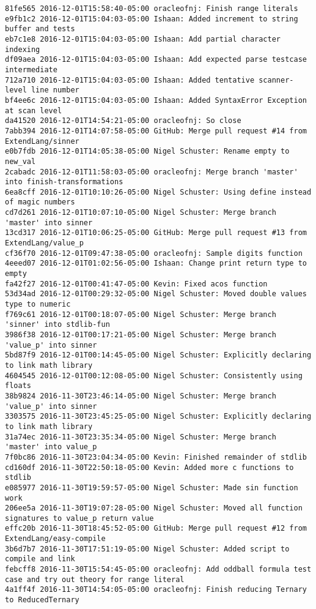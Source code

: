 \begin{lstlisting}
81fe565 2016-12-01T15:58:40-05:00 oracleofnj: Finish range literals
e9fb1c2 2016-12-01T15:04:03-05:00 Ishaan: Added increment to string buffer and tests
eb7c1e8 2016-12-01T15:04:03-05:00 Ishaan: Add partial character indexing
df09aea 2016-12-01T15:04:03-05:00 Ishaan: Add expected parse testcase intermediate
712a710 2016-12-01T15:04:03-05:00 Ishaan: Added tentative scanner-level line number
bf4ee6c 2016-12-01T15:04:03-05:00 Ishaan: Added SyntaxError Exception at scan level
da41520 2016-12-01T14:54:21-05:00 oracleofnj: So close
7abb394 2016-12-01T14:07:58-05:00 GitHub: Merge pull request #14 from ExtendLang/sinner
e0b7fdb 2016-12-01T14:05:38-05:00 Nigel Schuster: Rename empty to new_val
2cabadc 2016-12-01T11:58:03-05:00 oracleofnj: Merge branch 'master' into finish-transformations
6ea8cff 2016-12-01T10:10:26-05:00 Nigel Schuster: Using define instead of magic numbers
cd7d261 2016-12-01T10:07:10-05:00 Nigel Schuster: Merge branch 'master' into sinner
13cd317 2016-12-01T10:06:25-05:00 GitHub: Merge pull request #13 from ExtendLang/value_p
cf36f70 2016-12-01T09:47:38-05:00 oracleofnj: Sample digits function
4eeed07 2016-12-01T01:02:56-05:00 Ishaan: Change print return type to empty
fa42f27 2016-12-01T00:41:47-05:00 Kevin: Fixed acos function
53d34ad 2016-12-01T00:29:32-05:00 Nigel Schuster: Moved double values type to numeric
f769c61 2016-12-01T00:18:07-05:00 Nigel Schuster: Merge branch 'sinner' into stdlib-fun
3986f38 2016-12-01T00:17:21-05:00 Nigel Schuster: Merge branch 'value_p' into sinner
5bd87f9 2016-12-01T00:14:45-05:00 Nigel Schuster: Explicitly declaring to link math library
4604545 2016-12-01T00:12:08-05:00 Nigel Schuster: Consistently using floats
38b9824 2016-11-30T23:46:14-05:00 Nigel Schuster: Merge branch 'value_p' into sinner
3303575 2016-11-30T23:45:25-05:00 Nigel Schuster: Explicitly declaring to link math library
31a74ec 2016-11-30T23:35:34-05:00 Nigel Schuster: Merge branch 'master' into value_p
7f0bc86 2016-11-30T23:04:34-05:00 Kevin: Finished remainder of stdlib
cd160df 2016-11-30T22:50:18-05:00 Kevin: Added more c functions to stdlib
e085977 2016-11-30T19:59:57-05:00 Nigel Schuster: Made sin function work
206ee5a 2016-11-30T19:07:28-05:00 Nigel Schuster: Moved all function signatures to value_p return value
effc20b 2016-11-30T18:45:52-05:00 GitHub: Merge pull request #12 from ExtendLang/easy-compile
3b6d7b7 2016-11-30T17:51:19-05:00 Nigel Schuster: Added script to compile and link
febcff8 2016-11-30T15:54:45-05:00 oracleofnj: Add oddball formula test case and try out theory for range literal
4a1ff4f 2016-11-30T14:54:05-05:00 oracleofnj: Finish reducing Ternary to ReducedTernary

\end{lstlisting}
